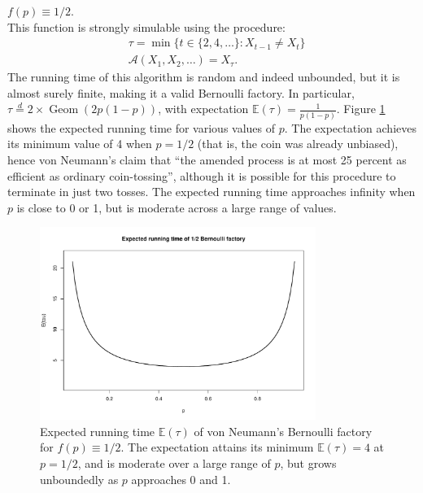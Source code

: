 \documentclass{article}
\theoremstyle{definition}
\newenvironment{example}
  {\pushQED{\qed}\renewcommand{\qedsymbol}{$\triangle$}\examplex}
  {\popQED\endexamplex}
\newcommand{\E}{\mathbb{E}}
\newcommand{\eqdist}{\overset{d}{=}}
\newcommand{\Geom}{\operatorname{Geom}}
\newcommand{\A}{\mathcal{A}}
\begin{document}
\begin{example}\label{ex:const_half}
$f(p) \equiv 1/2$.\\
This function is strongly simulable using the procedure:
\begin{align*}
& \tau = \min\{ t \in \{2,4,\dots\} : X_{t-1} \neq X_t \} \\
& \A(X_1,X_2,\dots) = X_\tau.
\end{align*}
The running time of this algorithm is random and indeed unbounded, but it is almost surely finite, making it a valid Bernoulli factory. In particular, $\tau \eqdist 2\times\Geom(2p(1-p))$, with expectation $\E(\tau) = \frac{1}{p(1-p)}$. Figure \ref{fig:runtime_const2} shows the expected running time for various values of $p$. The expectation achieves its minimum value of 4 when $p=1/2$ (that is, the coin was already unbiased), hence von Neumann's claim that ``the amended process is at most 25 percent as efficient as ordinary coin-tossing'', although it is possible for this procedure to terminate in just two tosses. The expected running time approaches infinity when $p$ is close to 0 or 1, but is moderate across a large range of values.
\begin{figure}
\centering
\includegraphics[width=0.8\textwidth]{vonneu_runtime.pdf}
\caption{Expected running time $\E(\tau)$ of von Neumann's Bernoulli factory for $f(p)\equiv 1/2$.  The expectation attains its minimum $\E(\tau)=4$ at $p=1/2$, and is moderate over a large range of $p$, but grows unboundedly as $p$ approaches 0 and 1.}
\label{fig:runtime_const2}
\end{figure}
\end{example}
\end{document}
